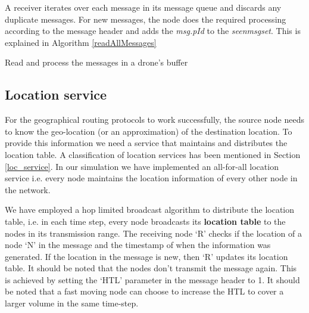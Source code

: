 A receiver iterates over each message in its message queue and discards any duplicate messages. For new messages, the node does the required processing according to the message header and adds the \emph{msg.pId} to the \emph{seen\textunderscore msg\textunderscore set}. This is explained in Algorithm \ref{readAllMessages}

\begin{algorithm}
    \caption{Read and process the messages in a drone's buffer} 
    \label{readAllMessages}
    \DontPrintSemicolon
    
\end{algorithm}

\subsection{Location service} \label{loc_service_impl}

For the geographical routing protocols to work successfully, the source node needs to know the geo-location (or an approximation) of the destination location. To provide this information we need a service that maintains and distributes the location table. A classification of location services has been mentioned in Section \ref{loc_service}. In our simulation we have implemented an all-for-all location service i.e. every node maintains the location information of every other node in the network. 

We have employed a hop limited broadcast algorithm to distribute the location table, i.e. in each time step, every node broadcasts its \textbf{location table} to the nodes in its transmission range. The receiving node `R' checks if the location of a node `N' in the message and the timestamp of when the information was generated. If the location in the message is new, then `R' updates its location table. It should be noted that the nodes don't transmit the message again. This is achieved by setting the `HTL' parameter in the message header to 1. It should be noted that a fast moving node can choose to increase the HTL to cover a larger volume in the same time-step.

